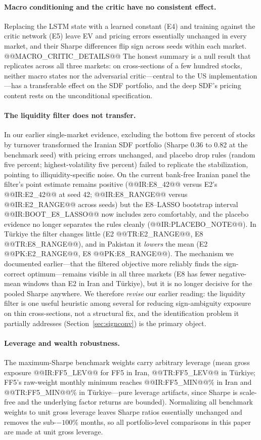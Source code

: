 \documentclass[12pt]{article}
\begin{document}
\paragraph{Macro conditioning and the critic have no consistent effect.} Replacing the LSTM state with a learned constant (E4) and training against the critic network (E5) leave EV and pricing errors essentially unchanged in every market, and their Sharpe differences flip sign across seeds within each market. @@MACRO_CRITIC_DETAILS@@ The honest summary is a null result that replicates across all three markets: on cross-sections of a few hundred stocks, neither macro states nor the adversarial critic---central to the US implementation---has a transferable effect on the SDF portfolio, and the deep SDF's pricing content rests on the unconditional specification.

\paragraph{The liquidity filter does not transfer.} In our earlier single-market evidence, excluding the bottom five percent of stocks by turnover transformed the Iranian SDF portfolio (Sharpe 0.36 to 0.82 at the benchmark seed) with pricing errors unchanged, and placebo drop rules (random five percent; highest-volatility five percent) failed to replicate the stabilization, pointing to illiquidity-specific noise. On the current bank-free Iranian panel the filter's point estimate remains positive (@@IR:E8_42@@ versus E2's @@IR:E2_42@@ at seed 42; @@IR:E8_RANGE@@ versus @@IR:E2_RANGE@@ across seeds) but the E8--LASSO bootstrap interval @@IR:BOOT_E8_LASSO@@ now includes zero comfortably, and the placebo evidence no longer separates the rules cleanly (@@IR:PLACEBO_NOTE@@). In T\"urkiye the filter changes little (E2 @@TR:E2_RANGE@@, E8 @@TR:E8_RANGE@@), and in Pakistan it \emph{lowers} the mean (E2 @@PK:E2_RANGE@@, E8 @@PK:E8_RANGE@@). The mechanism we documented earlier---that the filtered objective more reliably finds the sign-correct optimum---remains visible in all three markets (E8 has fewer negative-mean windows than E2 in Iran and T\"urkiye), but it is no longer decisive for the pooled Sharpe anywhere. We therefore \emph{revise} our earlier reading: the liquidity filter is one useful heuristic among several for reducing sign-ambiguity exposure on thin cross-sections, not a structural fix, and the identification problem it partially addresses (Section~\ref{sec:signconv}) is the primary object.

\paragraph{Leverage and wealth robustness.} The maximum-Sharpe benchmark weights carry arbitrary leverage (mean gross exposure @@IR:FF5_LEV@@ for FF5 in Iran, @@TR:FF5_LEV@@ in T\"urkiye; FF5's raw-weight monthly minimum reaches @@IR:FF5_MIN@@\% in Iran and @@TR:FF5_MIN@@\% in T\"urkiye---pure leverage artifacts, since Sharpe is scale-free and the underlying factor returns are bounded). Normalizing all benchmark weights to unit gross leverage leaves Sharpe ratios essentially unchanged and removes the sub-$-100\%$ months, so all portfolio-level comparisons in this paper are made at unit gross leverage.
\end{document}
